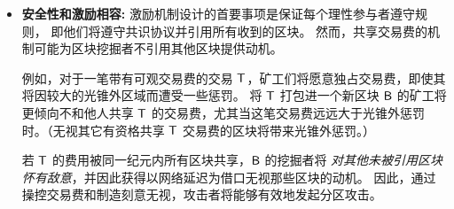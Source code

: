 	\begin{itemize}
		\item {\bf 安全性和激励相容:} 
		激励机制设计的首要事项是保证每个理性参与者遵守规则，
		即他们将遵守共识协议并引用所有收到的区块。
		然而，共享交易费的机制可能为区块挖掘者不引用其他区块提供动机。

		例如，对于一笔带有可观交易费的交易 $\textsf{T}$，矿工们将愿意独占交易费，即使其将因较大的光锥外区域而遭受一些惩罚。
		将 $\textsf{T}$ 打包进一个新区块 $\textsf{B}$ 的矿工将更倾向不和他人共享 $\textsf{T}$ 的交易费，尤其当这笔交易费远远大于光锥外惩罚时。（无视其它有资格共享 $\textsf{T}$ 交易费的区块将带来光锥外惩罚。）

		若 $\textsf{T}$ 的费用被同一纪元内所有区块共享，$\textsf{B}$ 的挖掘者将 \emph{对其他未被引用区块怀有敌意}，并因此获得以网络延迟为借口无视那些区块的动机。
		因此，通过操控交易费和制造刻意无视，攻击者将能够有效地发起分区攻击。


\end{itemize}
